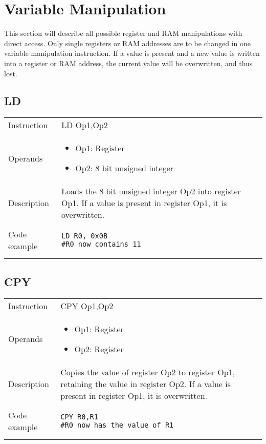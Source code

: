 \newpage

\section{Variable Manipulation}
This section will describe all possible register and RAM manipulations with direct access. Only single registers or RAM addresses
are to be changed in one variable manipulation instruction. If a value is present and a new value is written into a register or
RAM address, the current value will be overwritten, and thus lost.

\subsection{LD}
\renewcommand*{\arraystretch}{2.0}
\begin{longtable}{P{3cm}P{9cm}}
\midrule
\noindent Instruction & LD Op1,Op2 \\
\noindent Operands &
\begin{itemize}[label={},noitemsep,leftmargin=*,topsep=0pt,partopsep=0pt, itemsep=1em]
\item Op1: Register
\item Op2: 8 bit unsigned integer
\end{itemize}\\
\noindent Description & Loads the 8 bit unsigned integer Op2 into register Op1. If a value is present in register Op1, it is overwritten.
	 \\
\noindent Code example & 
\begin{lstlisting}
LD R0, 0x0B
#R0 now contains 11
\end{lstlisting} \\
\end{longtable}


\subsection{CPY}
\renewcommand*{\arraystretch}{2.0}
\begin{longtable}{P{3cm}P{9cm}}
\midrule
\noindent Instruction & CPY Op1,Op2 \\
\noindent Operands &
\begin{itemize}[label={},noitemsep,leftmargin=*,topsep=0pt,partopsep=0pt, itemsep=1em]
\item Op1: Register
\item Op2: Register
\end{itemize}\\
\noindent Description & Copies the value of register Op2 to register Op1, retaining the value in register Op2. If a value is present in register Op1, it is overwritten.
	 \\
\noindent Code example & 
\begin{lstlisting}
CPY R0,R1
#R0 now has the value of R1
\end{lstlisting} \\
\end{longtable}

